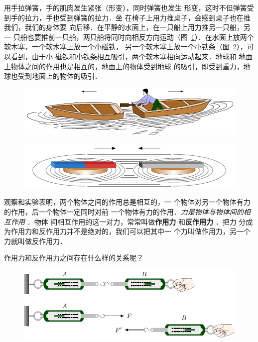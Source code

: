     用手拉弹簧，手的肌肉发生紧张（形变），同时弹簧也发生
形变，这时不但弹簧受到手的拉力，手也受到弹簧的拉力．坐
在椅子上用力推桌子，会感到桌子也在推我们，我们的身体要
向后移．在平静的水面上，在一只船上用力推另一只船，另一
只船也要推前一只船，两只船将同时向相反方向运动（图~\ref{fig_A_1-13}）．在水面上放两个软木塞，一个软木塞上放一个小磁铁，
另一个软木塞上放一个小铁条（图~\ref{fig_A_1-14}），可以看到，由于小
磁铁和小铁条相互吸引，两个软木塞相向运动起来．地球和
地面上物体之间的作用也是相互的，地面上的物体受到地球
的吸引，即受到重力，地球也受到地面上的物体的吸引．

\begin{figure} [htp]\centering
\includegraphics{fig/A/1-13.pdf} 
\caption{} \label{fig_A_1-13} 
\end{figure} 

\begin{figure} [htp]\centering
\includegraphics{fig/A/1-14.pdf} 
\caption{} \label{fig_A_1-14} 
\end{figure} 

观察和实验表明，两个物体之间的作用总是相互的，一
个物体对另一个物体有力的作用，后一个物体一定同时对前
一个物体有力的作用．\textit{力是物体与物体间的相互作用} ．物体
间相互作用的这一对力，常常叫做\textbf{作用力} 和\textbf{反作用力} ．把力
分成为作用力和反作用力并不是绝对的，我们可以把其中一
个力叫做作用力，另一个力就叫做反作用力．

    作用力和反作用力之间存在什么样的关系呢？

\begin{figure} [htp]\centering
\includegraphics{fig/A/1-15.pdf} 
\caption{} \label{fig_A_1-15} 
\end{figure} 

